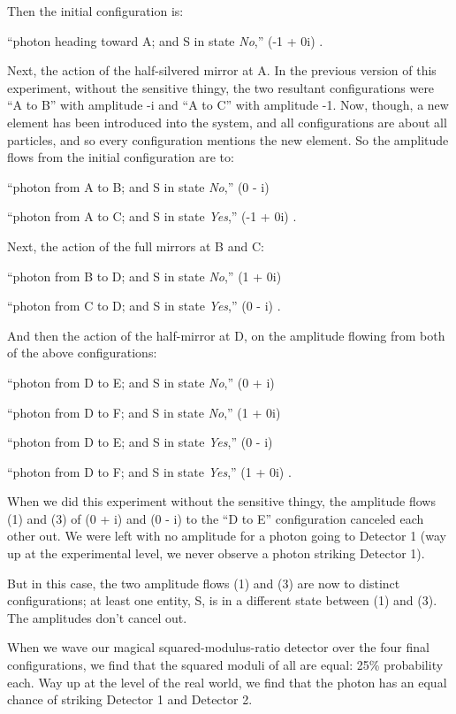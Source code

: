{
 Then the initial configuration is:}

{
 ``photon heading toward A; and S in state
\textit{No},'' (-1 + 0i) .}

{
 Next, the action of the half-silvered mirror at A. In the previous
version of this experiment, without the sensitive thingy, the two
resultant configurations were ``A to
B'' with amplitude -i and ``A to
C'' with amplitude -1. Now, though, a new element has
been introduced into the system, and all configurations are about all
particles, and so every configuration mentions the new element. So the
amplitude flows from the initial configuration are to:}

{
 ``photon from A to B; and S in state
\textit{No},'' (0 - i)}

{
 ``photon from A to C; and S in state
\textit{Yes},'' (-1 + 0i) .}

{
 Next, the action of the full mirrors at B and C:}

{
 ``photon from B to D; and S in state
\textit{No},'' (1 + 0i)}

{
 ``photon from C to D; and S in state
\textit{Yes},'' (0 - i) .}

{
 And then the action of the half-mirror at D, on the amplitude
flowing from both of the above configurations:}

{
 ``photon from D to E; and S in state
\textit{No},'' (0 + i)}

{
 ``photon from D to F; and S in state
\textit{No},'' (1 + 0i)}

{
 ``photon from D to E; and S in state
\textit{Yes},'' (0 - i)}

{
 ``photon from D to F; and S in state
\textit{Yes},'' (1 + 0i) .}

{
 When we did this experiment without the sensitive thingy, the
amplitude flows (1) and (3) of (0 + i) and (0 - i) to the
``D to E'' configuration canceled
each other out. We were left with no amplitude for a photon going to
Detector 1 (way up at the experimental level, we never observe a photon
striking Detector 1).}

{
 But in this case, the two amplitude flows (1) and (3) are now to
distinct configurations; at least one entity, S, is in a different
state between (1) and (3). The amplitudes don't cancel
out.}

{
 When we wave our magical squared-modulus-ratio detector over the
four final configurations, we find that the squared moduli of all are
equal: 25\% probability each. Way up at the level of the real world, we
find that the photon has an equal chance of striking Detector 1 and
Detector 2.}

